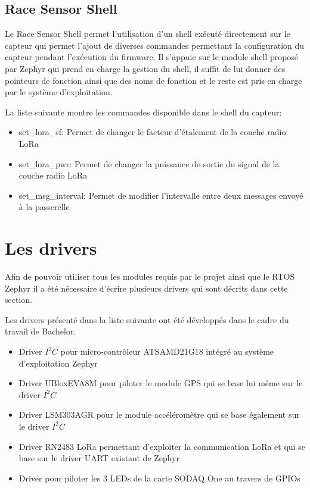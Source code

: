 \subsection{Race Sensor Shell}

Le Race Sensor Shell permet l'utilisation d'un shell exécuté directement sur le capteur qui permet l'ajout de diverses commandes permettant la configuration du capteur pendant l'exécution du firmware. Il s'appuie sur le module shell proposé par Zephyr qui prend en charge la gestion du shell, il suffit de lui donner des pointeurs de fonction ainsi que des noms de fonction et le reste est pris en charge par le système d'exploitation.

La liste suivante montre les commandes disponible dans le shell du capteur:

\begin{itemize}
\item set\_lora\_sf: Permet de changer le facteur d'étalement de la couche radio LoRa
\item set\_lora\_pwr: Permet de changer la puissance de sortie du signal de la couche radio LoRa
\item set\_msg\_interval: Permet de modifier l'intervalle entre deux messages envoyé à la passerelle
\end{itemize}

\section{Les drivers}\label{ch:drivers}

Afin de pouvoir utiliser tous les modules requis par le projet ainsi que le RTOS Zephyr il a été nécessaire d'écrire plusieurs drivers qui sont décrits dans cette section.

Les drivers présenté dans la liste suivante ont été développés dans le cadre du travail de Bachelor.

\begin{itemize}
\item Driver $I^{2}C$ pour micro-contrôleur ATSAMD21G18 intégré au système d'exploitation Zephyr
\item Driver UBloxEVA8M pour piloter le module GPS qui se base lui même sur le driver $I^{2}C$
\item Driver LSM303AGR pour le module accéléromètre qui se base également sur le driver  $I^{2}C$
\item Driver RN2483 LoRa permettant d'exploiter la communication LoRa et qui se base sur le driver UART existant de Zephyr
\item Driver pour piloter les 3 LEDs de la carte SODAQ One au travers de GPIOs
\end{itemize}

